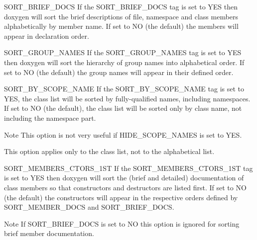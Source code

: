 \begin{DoxyDescription}
\item[{\ttfamily SORT\_\-BRIEF\_\-DOCS} ] If the {\ttfamily SORT\_\-BRIEF\_\-DOCS} tag is set to {\ttfamily YES} then doxygen will sort the brief descriptions of file, namespace and class members alphabetically by member name. If set to {\ttfamily NO} (the default) the members will appear in declaration order.

\label{config_cfg_sort_group_names}
\hypertarget{config_cfg_sort_group_names}{}
 
\item[{\ttfamily SORT\_\-GROUP\_\-NAMES} ] If the {\ttfamily SORT\_\-GROUP\_\-NAMES} tag is set to {\ttfamily YES} then doxygen will sort the hierarchy of group names into alphabetical order. If set to {\ttfamily NO} (the default) the group names will appear in their defined order.

\label{config_cfg_sort_by_scope_name}
\hypertarget{config_cfg_sort_by_scope_name}{}
 
\item[{\ttfamily SORT\_\-BY\_\-SCOPE\_\-NAME} ] If the {\ttfamily SORT\_\-BY\_\-SCOPE\_\-NAME} tag is set to {\ttfamily YES}, the class list will be sorted by fully-\/qualified names, including namespaces. If set to NO (the default), the class list will be sorted only by class name, not including the namespace part. \begin{DoxyNote}{Note}
This option is not very useful if {\ttfamily HIDE\_\-SCOPE\_\-NAMES} is set to {\ttfamily YES}. 

This option applies only to the class list, not to the alphabetical list.
\end{DoxyNote}
\label{config_cfg_sort_members_constructors_first}
\hypertarget{config_cfg_sort_members_constructors_first}{}
 
\item[{\ttfamily SORT\_\-MEMBERS\_\-CTORS\_\-1ST} ] If the {\ttfamily SORT\_\-MEMBERS\_\-CTORS\_\-1ST} tag is set to {\ttfamily YES} then doxygen will sort the (brief and detailed) documentation of class members so that constructors and destructors are listed first. If set to NO (the default) the constructors will appear in the respective orders defined by {\ttfamily SORT\_\-MEMBER\_\-DOCS} and {\ttfamily SORT\_\-BRIEF\_\-DOCS}. \begin{DoxyNote}{Note}
If {\ttfamily SORT\_\-BRIEF\_\-DOCS} is set to {\ttfamily NO} this option is ignored for sorting brief member documentation. 


\end{DoxyNote}
\end{DoxyDescription}
